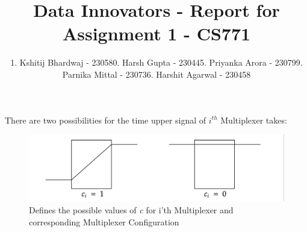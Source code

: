 \documentclass{article}
\title{Data Innovators - Report for Assignment 1 - CS771}
\author{%
  1. Kshitij Bhardwaj - 230580\AND
  2. Harsh Gupta - 230445\AND
  3. Priyanka Arora - 230799\AND
  4. Parnika Mittal - 230736\AND
  5. Harshit Agarwal - 230458\AND
}
\begin{document}
\maketitle
\large
\section{}


There are two possibilities for the time upper signal of $ i^{th}$ Multiplexer takes:
\begin{figure}[h]
\centering
\includegraphics[scale=0.75]{cases.png}
\caption{Defines the possible values of \textit{c} for i'th Multiplexer and corresponding Multiplexer Configuration}
\end{figure}
\end{document}
